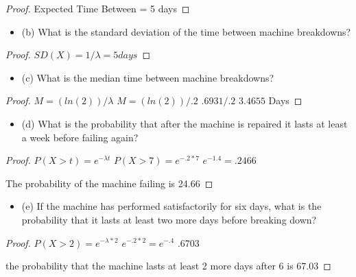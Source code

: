 \documentclass{article}
\begin{document}
\begin{enumerate}
\begin{proof}
Expected Time Between = 5 days
    \end{proof}
    \begin{itemize}
        \item (b) What is the standard deviation of the time between machine breakdowns?
    \end{itemize}
\begin{proof}
$SD(X) = 1/\lambda = 5 days$
    \end{proof}
        \begin{itemize}
            \item (c)   What is the median time between machine breakdowns?
        \end{itemize}
    \begin{proof}
$M = (ln(2))/\lambda$
$M = (ln(2))/.2$
$.6931/.2$
$3.4655$ Days

\end{proof}
        \begin{itemize}
            \item (d)  What is the probability that after the machine is repaired it lasts at least a week before failing again?
        \end{itemize}
\begin{proof}
$P(X>t)=e^{-\lambda t}$
$P(X>7) = e^{-.2*7}$
$e^{-1.4} = .2466$

The probability of the machine failing is 24.66
    \end{proof}
    \begin{itemize}
        \item (e)   If the machine has performed satisfactorily for six days, what is the probability that it lasts at least two more days before breaking down?
    \end{itemize}
\begin{proof}
$P(X>2)= e^{-\lambda *2}$
$e^{-.2*2} = e^{-.4}$
.6703

the probability that the machine lasts at least 2 more days after 6 is 67.03%
    \end{proof}


\begin{enumerate}
\end{enumerate}
\end{enumerate}
  
		
\end{document}
